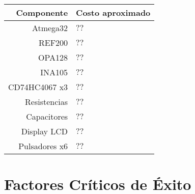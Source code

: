\begin{table}[H]
\begin{center}
\begin{tabular}{|r|l|}
    \hline
    \textbf{Componente} &
    \textbf{Costo aproximado} \\ \hline
    Atmega32 & $??$ \\ \hline
    REF200 & $??$ \\ \hline
    OPA128 & $??$ \\ \hline
    INA105 & $??$ \\ \hline
    CD74HC4067 x3 & $??$ \\ \hline
    Resistencias & $??$ \\ \hline
    Capacitores & $??$ \\ \hline
    Display LCD & $??$ \\ \hline
    Pulsadores x6 & $??$ \\ \hline
\end{tabular}
\end{center}
\end{table}

\section{Factores Críticos de Éxito}
